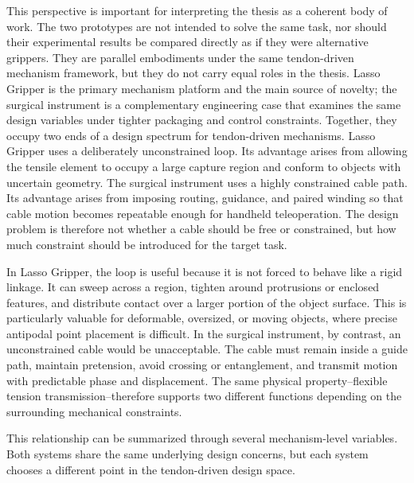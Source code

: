 This perspective is important for interpreting the thesis as a coherent body of work. The two prototypes are not intended to solve the same task, nor should their experimental results be compared directly as if they were alternative grippers. They are parallel embodiments under the same tendon-driven mechanism framework, but they do not carry equal roles in the thesis. Lasso Gripper is the primary mechanism platform and the main source of novelty; the surgical instrument is a complementary engineering case that examines the same design variables under tighter packaging and control constraints. Together, they occupy two ends of a design spectrum for tendon-driven mechanisms. Lasso Gripper uses a deliberately unconstrained loop. Its advantage arises from allowing the tensile element to occupy a large capture region and conform to objects with uncertain geometry. The surgical instrument uses a highly constrained cable path. Its advantage arises from imposing routing, guidance, and paired winding so that cable motion becomes repeatable enough for handheld teleoperation. The design problem is therefore not whether a cable should be free or constrained, but how much constraint should be introduced for the target task.

In Lasso Gripper, the loop is useful because it is not forced to behave like a rigid linkage. It can sweep across a region, tighten around protrusions or enclosed features, and distribute contact over a larger portion of the object surface. This is particularly valuable for deformable, oversized, or moving objects, where precise antipodal point placement is difficult. In the surgical instrument, by contrast, an unconstrained cable would be unacceptable. The cable must remain inside a guide path, maintain pretension, avoid crossing or entanglement, and transmit motion with predictable phase and displacement. The same physical property--flexible tension transmission--therefore supports two different functions depending on the surrounding mechanical constraints.

This relationship can be summarized through several mechanism-level variables. Both systems share the same underlying design concerns, but each system chooses a different point in the tendon-driven design space.

